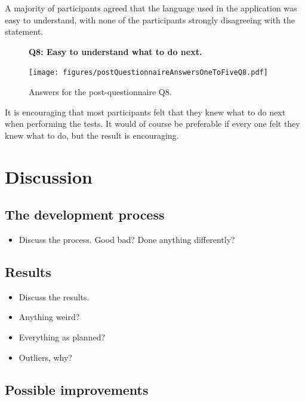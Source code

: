 \documentclass[nofilelist,dvipsnames]{cslthse-msc}
\begin{document}
{        A majority of participants agreed that the language used in the
        application was easy to understand, with none of the participants
        strongly disagreeing with the statement.

				\begin{figure}[h!]
          \textbf{Q8: Easy to understand what to do next.}
          \begin{center}
            \texttt{[image: figures/postQuestionnaireAnswersOneToFiveQ8.pdf]}
            \vspace{-1cm}
            \caption{Answers for the post-questionnaire Q8.}
          \end{center}
				\end{figure}

        It is encouraging that most participants felt that they knew what to do
        next when performing the tests. It would of course be preferable if
        every one felt they knew what to do, but the result is encouraging.

		\chapter{Discussion}

      \section{The development process}


        \begin{itemize}
          \item{Discuss the process. Good bad? Done anything differently?}
        \end{itemize}

      \section{Results}

        \begin{itemize}
          \item{Discuss the results.}
          \item{Anything weird?}
          \item{Everything as planned?}
          \item{Outliers, why?}
        \end{itemize}

			\section{Possible improvements}

}
\end{document}

